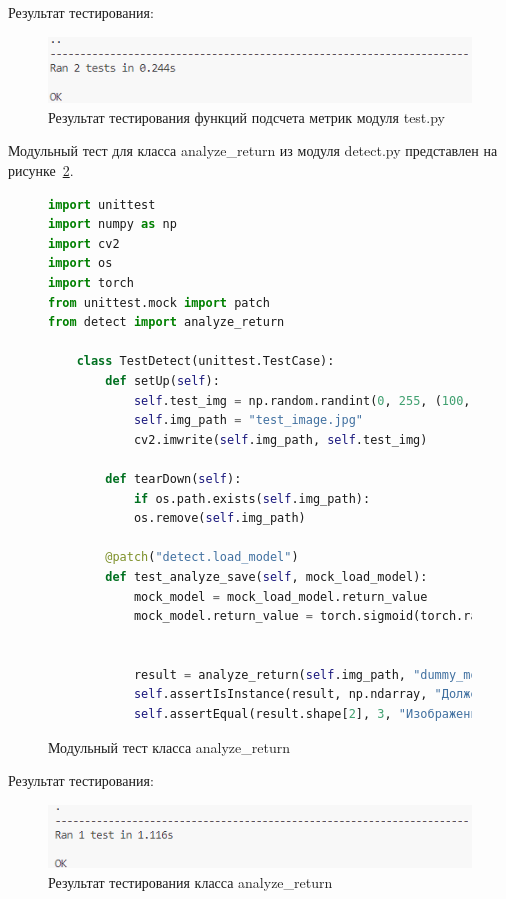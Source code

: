 Результат тестирования:
\begin{figure}[H]
	\centering
	\includegraphics[width=0.7\linewidth]{images/test_test_results}
	\caption{Результат тестирования функций подсчета метрик модуля test.py}
	\label{fig:testtestresults}
\end{figure}

Модульный тест для класса analyze\_return из модуля detect.py представлен на рисунке~\ref{detect_test:image}.

\begin{figure}[H]
	\begin{lstlisting}[language=Python]
import unittest
import numpy as np
import cv2
import os
import torch
from unittest.mock import patch
from detect import analyze_return

	class TestDetect(unittest.TestCase):
		def setUp(self):
			self.test_img = np.random.randint(0, 255, (100, 100, 3), dtype=np.uint8)
			self.img_path = "test_image.jpg"
			cv2.imwrite(self.img_path, self.test_img)

		def tearDown(self):
			if os.path.exists(self.img_path):
			os.remove(self.img_path)

		@patch("detect.load_model")
		def test_analyze_save(self, mock_load_model):
			mock_model = mock_load_model.return_value
			mock_model.return_value = torch.sigmoid(torch.randn(1, 1, 320, 624))


			result = analyze_return(self.img_path, "dummy_model.pth")
			self.assertIsInstance(result, np.ndarray, "Должен возвращаться numpy-массив")
			self.assertEqual(result.shape[2], 3, "Изображение должно быть 3-канальным (BGR)")

	\end{lstlisting}  
	\caption{Модульный тест класса analyze\_return}
	\label{detect_test:image}
\end{figure}

Результат тестирования:
\begin{figure}[H]
	\centering
	\includegraphics[width=0.7\linewidth]{images/detect_test_results}
	\caption{Результат тестирования класса analyze\_return}
	\label{fig:detecttestresults}
\end{figure}



